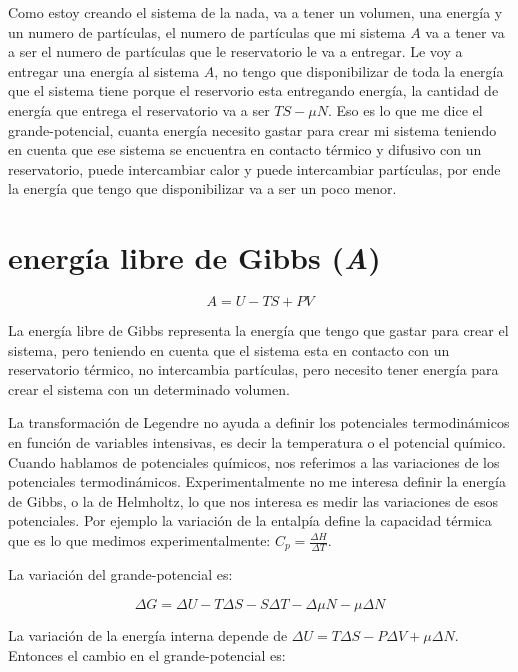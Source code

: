 \documentclass[11pt,fleqn]{book}
\begin{document}
Como estoy creando el sistema de la nada, va a tener un volumen, una energía y un numero de partículas, el numero de partículas que mi sistema $A$ va a tener va a ser el numero de partículas que le reservatorio le va a entregar. Le voy a entregar una energía al sistema $A$, no tengo que disponibilizar de toda la energía que el sistema tiene porque el reservorio esta entregando energía, la cantidad de energía que entrega el reservatorio va a ser $TS-\mu N$. Eso es lo que me dice el grande-potencial, cuanta energía necesito gastar para crear mi sistema teniendo en cuenta que ese sistema se encuentra en contacto térmico y difusivo con un reservatorio, puede intercambiar calor y puede intercambiar partículas, por ende la energía que tengo que disponibilizar va a ser un poco menor. 

\section{energía libre de Gibbs (\textit{A})}

\begin{equation}
A=U-TS+PV
    \label{Eq. 5.12}
\end{equation}

La energía libre de Gibbs representa la energía que tengo que gastar para crear el sistema, pero teniendo en cuenta que el sistema esta en contacto con un reservatorio térmico, no intercambia partículas, pero necesito tener energía para crear el sistema con un determinado volumen. 

La transformación de Legendre no ayuda a definir los potenciales termodinámicos en función de variables intensivas, es decir la temperatura o el potencial químico. Cuando hablamos de potenciales químicos, nos referimos a las variaciones de los potenciales termodinámicos. Experimentalmente no me interesa definir la energía de Gibbs, o la de Helmholtz, lo que nos interesa es medir las variaciones de esos potenciales. Por ejemplo la variación de la entalpía define la capacidad térmica que es lo que medimos experimentalmente: $C_{p}=\frac{\Delta H}{\Delta T}$. 

La variación del grande-potencial es:

\begin{equation*}
    \Delta G=\Delta U-T\Delta S-S\Delta T-\Delta\mu N-\mu\Delta  N    
\end{equation*}

La variación de la energía interna depende de $\Delta U=T\Delta S-P\Delta V+\mu\Delta N$. Entonces el cambio en el grande-potencial es:
\end{document}
